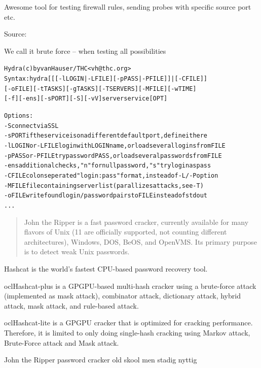 \documentclass[Screen16to9,17pt]{foils}
\begin{document}
Awesome tool for testing firewall rules, sending probes with specific source port etc.



Source:


\begin{list1}
\item We call it brute force -- when testing all possibilities
\end{list1}

\begin{alltt}\small
Hydra (c) by van Hauser / THC <vh@thc.org>
Syntax: hydra [[[-l LOGIN|-L FILE] [-p PASS|-P FILE]] | [-C FILE]]
[-o FILE] [-t TASKS] [-g TASKS] [-T SERVERS] [-M FILE] [-w TIME]
[-f] [-e ns] [-s PORT] [-S] [-vV] server service [OPT]

Options:
  -S        connect via SSL
  -s PORT   if the service is on a different default port, define it here
  -l LOGIN  or -L FILE login with LOGIN name, or load several logins from FILE
  -p PASS   or -P FILE try password PASS, or load several passwords from FILE
  -e ns     additional checks, "n" for null password, "s" try login as pass
  -C FILE   colon seperated "login:pass" format, instead of -L/-P option
  -M FILE   file containing server list (parallizes attacks, see -T)
  -o FILE   write found login/password pairs to FILE instead of stdout
...
\end{alltt}



\begin{quote}
John the Ripper is a fast password cracker, currently available for
many flavors of Unix (11 are officially supported, not counting
different architectures), Windows, DOS, BeOS, and OpenVMS. Its primary
purpose is to detect weak Unix passwords.
\end{quote}

\begin{list2}
\item Hashcat is the world's fastest CPU-based password recovery tool.
\item oclHashcat-plus is a GPGPU-based multi-hash cracker using a brute-force attack (implemented as mask attack), combinator attack, dictionary attack, hybrid attack, mask attack, and rule-based attack.
\item oclHashcat-lite is a GPGPU cracker that is optimized for cracking performance. Therefore, it is limited to only doing single-hash cracking using Markov attack, Brute-Force attack and Mask attack.
\item John the Ripper password cracker old skool men stadig nyttig
\end{list2}
\end{document}
